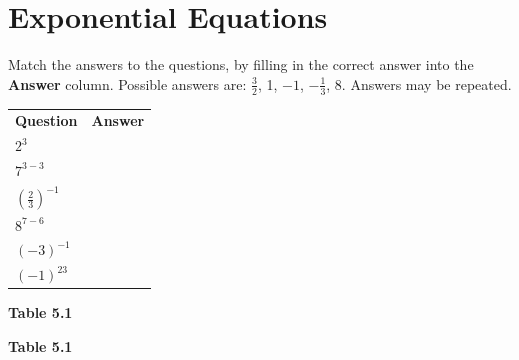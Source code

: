 \section{Exponential Equations}
            \nopagebreak
        \label{m38359*id67549}Match the answers to the questions, by filling in the correct answer into the \textbf{Answer} column.
Possible answers are: $\frac{3}{2}$, 1, $-1$, $-\frac{1}{3}$, 8. Answers may be repeated.\par 
          \begin{table}[H]
        \begin{center}
      \label{m38359*id67604}
    \noindent
      \tablelasttail{}
      \begin{xtabular}[t]{|l|l|}\hline
                  \textbf{Question}
                 &
                  \textbf{Answer}
     \tabularnewline{}
                  ${2}^{3}$
                 &
     \tabularnewline{}
                  ${7}^{3-3}$
                 &
     \tabularnewline{}
                  ${\left(\frac{2}{3}\right)}^{-1}$
                 &
     \tabularnewline{}
                  ${8}^{7-6}$
                 &
     \tabularnewline{}
                  ${\left(-3\right)}^{-1}$
                 &
     \tabularnewline{}
                  ${\left(-1\right)}^{23}$
                 &
     \tabularnewline{}
    \end{xtabular}
      \end{center}
    \begin{center}{\small\bfseries Table 5.1}\end{center}
    \begin{caption}{\small\bfseries Table 5.1}\end{caption}
\end{table}
